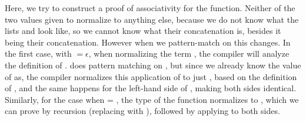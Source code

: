 	 	Here, we try to construct a proof of associativity for the
	 	\codett{\_++\_} function. Neither of the two values given to
	 	 normalize to anything else, because we do not know what
	 	the lists  and  look like, so we cannot know
	 	what their concatenation is, besides it being their concatenation.
	 	However when we pattern-match on  this changes. In the first
	 	case, with $=\epsilon$, when normalizing the term , the compiler will analyze the definition of
	 	\codett{\_++\_}. \codett{\_++\_} does pattern matching on ,
	 	but since we already know the value of as, the compiler normalizes this
	 	application of \codett{\_++\_} to just , based on the
	 	definition of \codett{\_++\_}, and the same happens for the left-hand
	 	side of , making both sides identical.  Similarly, for
	 	the case when  = , the type of the function
	 	normalizes to , which we can prove by recursion (replacing  with
	 	), followed by applying  to both sides.
